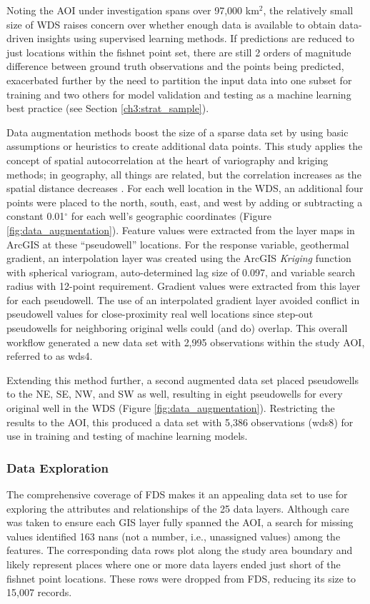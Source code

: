 Noting the AOI under investigation spans over 97,000 km$^2$, the relatively small size of WDS raises concern over whether enough data is available to obtain data-driven insights using supervised learning methods. If predictions are reduced to just locations within the fishnet point set, there are still 2 orders of magnitude difference between ground truth observations and the points being predicted, exacerbated further by the need to partition the input data into one subset for training and two others for model validation and testing as a machine learning best practice \citep[e.g.,][p.\ 222]{hastie_elements_2009} (see Section \ref{ch3:strat_sample}). 

Data augmentation methods boost the size of a sparse data set by using basic assumptions or heuristics to create additional data points. This study applies the concept of spatial autocorrelation at the heart of variography and kriging methods; in geography, all things are related, but the correlation increases as the spatial distance decreases \citep[Chapter\ 13]{gimond_intro_2021}. For each well location in the WDS, an additional four points were placed to the north, south, east, and west by adding or subtracting a constant 0.01$^\circ$ for each well’s geographic coordinates (Figure \ref{fig:data_augmentation}). Feature values were extracted from the layer maps in ArcGIS at these ``pseudowell'' locations. For the response variable, geothermal gradient, an interpolation layer was created using the ArcGIS \textit{Kriging} function with spherical variogram, auto-determined lag size of 0.097, and variable search radius with 12-point requirement. Gradient values were extracted from this layer for each pseudowell. The use of an interpolated gradient layer avoided conflict in pseudowell values for close-proximity real well locations since step-out pseudowells for neighboring original wells could (and do) overlap. This overall workflow generated a new data set with 2,995 observations within the study AOI, referred to as \acrshort{wds4}. 

Extending this method further, a second augmented data set placed pseudowells to the NE, SE, NW, and SW as well, resulting in eight pseudowells for every original well in the WDS (Figure \ref{fig:data_augmentation}). Restricting the results to the AOI, this produced a data set with 5,386 observations (\acrshort{wds8}) for use in training and testing of machine learning models.

\subsubsection{Data Exploration}
The comprehensive coverage of FDS makes it an appealing data set to use for exploring the attributes and relationships of the 25 data layers. Although care was taken to ensure each GIS layer fully spanned the AOI, a search for missing values identified 163 \acrshort{nan}s (not a number, i.e., unassigned values) among the features. The corresponding data rows plot along the study area boundary and likely represent places where one or more data layers ended just short of the fishnet point locations. These rows were dropped from FDS, reducing its size to 15,007 records.

